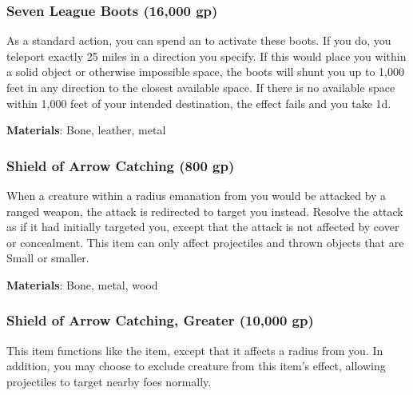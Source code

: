 \lowercase{\hypertarget{item:Seven League Boots}{}}\label{item:Seven League Boots}
\hypertarget{item:Seven League Boots}{\subsubsection{Seven League Boots\hfill{} (16,000 gp)}}

As a standard action, you can spend an  to activate these boots.
If you do, you teleport exactly 25 miles in a direction you specify.
If this would place you within a solid object or otherwise impossible space, the boots will shunt you up to 1,000 feet in any direction to the closest available space.
If there is no available space within 1,000 feet of your intended destination, the effect fails and you take  \minus1d.



\vspace{0.25em}
\textbf{Materials}: Bone, leather, metal


\lowercase{\hypertarget{item:Shield of Arrow Catching}{}}\label{item:Shield of Arrow Catching}
\hypertarget{item:Shield of Arrow Catching}{\subsubsection{Shield of Arrow Catching\hfill{} (800 gp)}}

When a creature within a \areamed radius emanation from you would be attacked by a ranged weapon, the attack is redirected to target you instead.
Resolve the attack as if it had initially targeted you, except that the attack is not affected by cover or concealment.
This item can only affect projectiles and thrown objects that are Small or smaller.



\vspace{0.25em}
\textbf{Materials}: Bone, metal, wood


\lowercase{\hypertarget{item:Shield of Arrow Catching, Greater}{}}\label{item:Shield of Arrow Catching, Greater}
\hypertarget{item:Shield of Arrow Catching, Greater}{\subsubsection{Shield of Arrow Catching, Greater\hfill{} (10,000 gp)}}

This item functions like the  item, except that it affects a \arealarge radius from you.
In addition, you may choose to exclude creature from this item's effect, allowing projectiles to target nearby foes normally.



